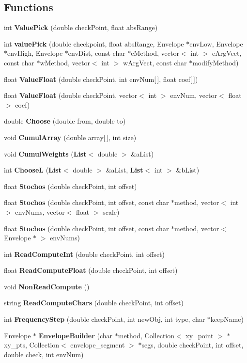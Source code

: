 \subsection*{Functions}
\begin{CompactItemize}
\item 
int {\bf Value\-Pick} (double check\-Point, float abs\-Range)
\item 
int {\bf value\-Pick} (double checkpoint, float abs\-Range, Envelope $\ast$env\-Low, Envelope $\ast$env\-High, Envelope $\ast$env\-Dist, const  char $\ast$e\-Method, vector$<$ int $>$ e\-Arg\-Vect, const  char $\ast$w\-Method, vector$<$ int $>$ w\-Arg\-Vect, const  char $\ast$modify\-Method)
\item 
float {\bf Value\-Float} (double check\-Point, int env\-Num[$\,$], float coef[$\,$])
\item 
float {\bf Value\-Float} (double check\-Point, vector$<$ int $>$ env\-Num, vector$<$ float $>$ coef)
\item 
double {\bf Choose} (double from, double to)
\item 
void {\bf Cumul\-Array} (double array[$\,$], int size)
\item 
void {\bf Cumul\-Weights} ({\bf List}$<$ double $>$ \&a\-List)
\item 
int {\bf Choose\-L} ({\bf List}$<$ double $>$ \&a\-List, {\bf List}$<$ int $>$ \&b\-List)
\item 
float {\bf Stochos} (double check\-Point, int offset)
\item 
float {\bf Stochos} (double check\-Point, int offset, const  char $\ast$method, vector$<$ int $>$ env\-Nums, vector$<$ float $>$ scale)
\item 
float {\bf Stochos} (double check\-Point, int offset, const  char $\ast$method, vector$<$ Envelope $\ast$ $>$ env\-Nums)
\item 
int {\bf Read\-Compute\-Int} (double check\-Point, int offset)
\item 
float {\bf Read\-Compute\-Float} (double check\-Point, int offset)
\item 
void {\bf Non\-Read\-Compute} ()
\item 
string {\bf Read\-Compute\-Chars} (double check\-Point, int offset)
\item 
int {\bf Frequency\-Step} (double check\-Point, int new\-Obj, int type, char $\ast$keep\-Name)
\item 
Envelope $\ast$ {\bf Envelope\-Builder} (char $\ast$method, Collection$<$ xy\_\-point $>$ $\ast$xy\_\-pts, Collection$<$ envelope\_\-segment $>$ $\ast$segs, double check\-Point, int offset, double check, int env\-Num)

\end{CompactItemize}
